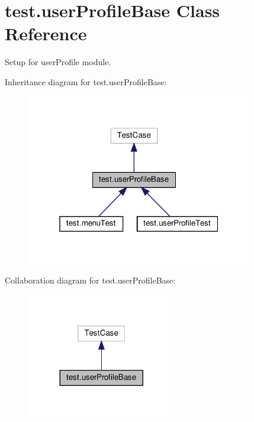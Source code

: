 \hypertarget{classtest_1_1userProfileBase}{}\section{test.\+user\+Profile\+Base Class Reference}
\label{classtest_1_1userProfileBase}


Setup for user\+Profile module.  




Inheritance diagram for test.\+user\+Profile\+Base\+:
\nopagebreak
\begin{figure}[H]
\begin{center}
\leavevmode
\includegraphics[width=280pt]{classtest_1_1userProfileBase__inherit__graph}
\end{center}
\end{figure}


Collaboration diagram for test.\+user\+Profile\+Base\+:
\nopagebreak
\begin{figure}[H]
\begin{center}
\leavevmode
\includegraphics[width=185pt]{classtest_1_1userProfileBase__coll__graph}
\end{center}
\end{figure}
